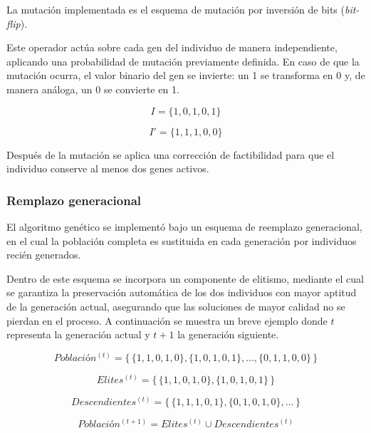 La mutación implementada es el esquema de mutación por inversión de bits (\textit{bit-flip}).

Este operador actúa sobre cada gen del individuo de manera independiente, aplicando una probabilidad de mutación previamente definida. En caso de que la mutación ocurra, el valor binario del gen se invierte: un 1 se transforma en 0 y, de manera análoga, un 0 se convierte en 1. 

\begin{equation}
	I = \{1,0,1,0,1\}
\end{equation}

\begin{equation}
	I' = \{1,1,1,0,0\}
\end{equation}

Después de la mutación se aplica una corrección de factibilidad para que el individuo conserve al menos dos genes activos.


\subsubsection{Remplazo generacional}

El algoritmo genético se implementó bajo un esquema de reemplazo generacional, en el cual la población completa es sustituida en cada generación por individuos recién generados. 

Dentro de  este esquema se incorpora un componente de elitismo, mediante el cual se garantiza la preservación automática de los dos individuos con mayor aptitud de la generación actual, asegurando que las soluciones de mayor calidad no se pierdan en el proceso. A continuación se muestra un breve ejemplo donde $t$ representa la generación actual y $t+1$ la generación siguiente.

\begin{equation}
	Poblaci\text{ó}n^{(t)} = 
	\{\, \{1,1,0,1,0\}, \{1,0,1,0,1\}, \ldots, \{0,1,1,0,0\} \,\}
\end{equation}

\begin{equation}
	Elites^{(t)} = \{\, \{1,1,0,1,0\}, \{1,0,1,0,1\} \,\}
\end{equation}

\begin{equation}
	Descendientes^{(t)} = \{\, \{1,1,1,0,1\}, \{0,1,0,1,0\}, \ldots \,\}
\end{equation}

\begin{equation}
	Poblaci\text{ó}n^{(t+1)} = Elites^{(t)} \cup Descendientes^{(t)}
	\label{eq:EMN4}
\end{equation}


